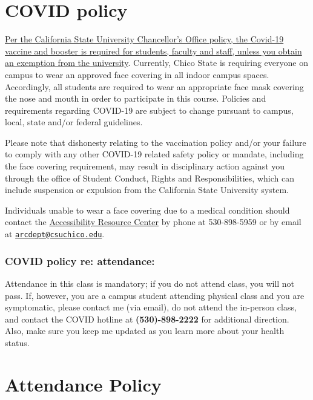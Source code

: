 \documentclass[11pt,]{article}
\begin{document}
\hypertarget{covid_policy}{%
\section{COVID policy}\label{covid_policy}}

\href{https://calstate.policystat.com/policy/11030468/latest/}{Per the
California State University Chancellor's Office policy, the Covid-19
vaccine and booster is required for students, faculty and staff, unless
you obtain an exemption from the university}. Currently, Chico State is
requiring everyone on campus to wear an approved face covering in all
indoor campus spaces. Accordingly, all students are required to wear an
appropriate face mask covering the nose and mouth in order to
participate in this course. Policies and requirements regarding COVID-19
are subject to change pursuant to campus, local, state and/or federal
guidelines.

Please note that dishonesty relating to the vaccination policy and/or
your failure to comply with any other COVID-19 related safety policy or
mandate, including the face covering requirement, may result in
disciplinary action against you through the office of Student Conduct,
Rights and Responsibilities, which can include suspension or expulsion
from the California State University system.

Individuals unable to wear a face covering due to a medical condition
should contact the \href{https://www.csuchico.edu/arc/}{Accessibility
Resource Center} by phone at 530-898-5959 or by email at
\href{mailto:arcdept@csuchico.edu}{\nolinkurl{arcdept@csuchico.edu}}.

\hypertarget{covid-policy-re-attendance}{%
\subsubsection{COVID policy re:
attendance:}\label{covid-policy-re-attendance}}

Attendance in this class is mandatory; if you do not attend class, you
will not pass. If, however, you are a campus student attending physical
class and you are symptomatic, please contact me (via email), do not
attend the in-person class, and contact the COVID hotline at
\textbf{(530)-898-2222} for additional direction. Also, make sure you
keep me updated as you learn more about your health status.

\hypertarget{attendance}{%
\section{Attendance Policy}\label{attendance}}
\end{document}
